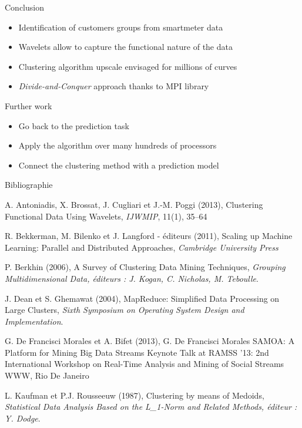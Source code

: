 \documentclass[xcolor=dvipsnames, smaller]{beamer}
\begin{document}
\begin{frame}{Conclusion}

\begin{itemize}
 \item Identification of customers groups from smartmeter data
 \item Wavelets allow to capture the functional nature of the data
 \item Clustering algorithm upscale envisaged for millions of curves
 \item \textit{Divide-and-Conquer} approach thanks to MPI library %
\end{itemize}

\begin{block}{Further work}
\begin{itemize}
 \item Go back to the prediction task
 \item Apply the algorithm over many hundreds of processors  
 \item Connect the clustering method with a prediction model
\end{itemize}
\end{block}
\end{frame}


\begin{frame}[plain]{Bibliographie}\small

\begin{thebibliography}{10}
 A. Antoniadis, X. Brossat, J. Cugliari et J.-M. Poggi (2013), Clustering Functional Data Using Wavelets, {\it IJWMIP}, 11(1), 35--64

 R. Bekkerman, M. Bilenko et J. Langford - éditeurs (2011), Scaling up Machine Learning: Parallel and Distributed Approaches, {\it Cambridge University Press}

 P. Berkhin (2006), A Survey of Clustering Data Mining Techniques, {\it Grouping Multidimensional Data, éditeurs : J. Kogan, C. Nicholas, M. Teboulle}.

 J. Dean et S. Ghemawat (2004), MapReduce: Simplified Data Processing on Large Clusters, {\it Sixth Symposium on Operating System Design and Implementation}.

 G. De Francisci Morales et A. Bifet (2013), G. De Francisci Morales SAMOA: A Platform for Mining Big Data Streams Keynote Talk at RAMSS ’13: 2nd International Workshop on Real-Time Analysis and Mining of Social Streams WWW, Rio De Janeiro

 L. Kaufman et P.J. Rousseeuw (1987), Clustering by means of Medoids, {\it Statistical Data Analysis Based on the L\_1-Norm and Related Methods, éditeur : Y. Dodge}.
\end{thebibliography}
\end{frame}
\end{document}
